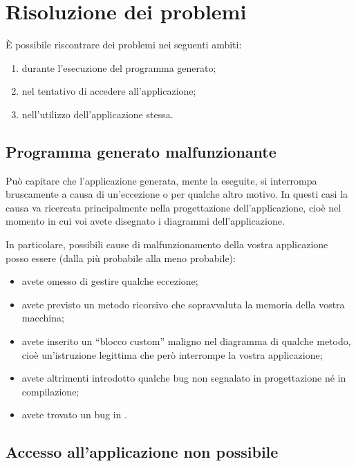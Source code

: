
\section{Risoluzione dei problemi} \label{sec:problemi}

È possibile riscontrare dei problemi nei seguenti ambiti:
\begin{enumerate}
	\item durante l'esecuzione del programma generato;
	\item nel tentativo di accedere all'applicazione;
	\item nell'utilizzo dell'applicazione stessa.
\end{enumerate}



\subsection{Programma generato malfunzionante} \label{sec:mal_gen}

Può capitare che l'applicazione generata, mente la eseguite, si interrompa bruscamente a causa di un'eccezione o per qualche altro motivo. In questi casi la causa va ricercata principalmente nella progettazione dell'applicazione, cioè nel momento in cui voi avete disegnato i diagrammi dell'applicazione.

In particolare, possibili cause di malfunzionamento della vostra applicazione posso essere (dalla più probabile alla meno probabile):
\begin{itemize}
	\item avete omesso di gestire qualche eccezione;
	\item avete previsto un metodo ricorsivo che sopravvaluta la memoria della vostra macchina;
	\item avete inserito un “blocco custom” maligno nel diagramma di qualche metodo, cioè un'istruzione legittima che però interrompe la vostra applicazione;
	\item avete altrimenti introdotto qualche bug non segnalato in progettazione né in compilazione;
	\item avete trovato un bug in \proj.
\end{itemize}



\subsection{Accesso all'applicazione non possibile}

